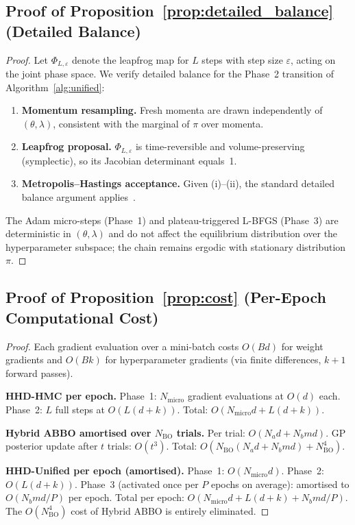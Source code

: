 \documentclass[11pt]{article}
\theoremstyle{definition}
\begin{document}
\subsection{Proof of Proposition~\ref{prop:detailed_balance} (Detailed Balance)}

\begin{proof}
Let $\Phi_{L,\varepsilon}$ denote the leapfrog map for $L$ steps with
step size $\varepsilon$, acting on the joint phase space.
We verify detailed balance for the Phase~2 transition of
Algorithm~\ref{alg:unified}:
\begin{enumerate}[label=(\roman*)]
  \item \textbf{Momentum resampling.} Fresh momenta are drawn
        independently of $(\theta,\lambda)$, consistent with the
        marginal of $\pi$ over momenta.

  \item \textbf{Leapfrog proposal.} $\Phi_{L,\varepsilon}$ is
        time-reversible and volume-preserving (symplectic), so its
        Jacobian determinant equals~1.

  \item \textbf{Metropolis--Hastings acceptance.} Given (i)--(ii),
        the standard detailed balance argument applies~\cite[Prop.~5.2]{neal2011}.
\end{enumerate}
The Adam micro-steps (Phase~1) and plateau-triggered L-BFGS
(Phase~3) are deterministic in $(\theta,\lambda)$ and do not affect
the equilibrium distribution over the hyperparameter subspace; the
chain remains ergodic with stationary distribution~$\pi$.
\end{proof}

\subsection{Proof of Proposition~\ref{prop:cost} (Per-Epoch Computational Cost)}

\begin{proof}
Each gradient evaluation over a mini-batch costs $O(Bd)$
for weight gradients and $O(Bk)$ for hyperparameter gradients
(via finite differences, $k+1$ forward passes).

\textbf{HHD-HMC per epoch.}
Phase~1: $N_{\mathrm{micro}}$ gradient evaluations at $O(d)$ each.
Phase~2: $L$ full steps at $O(L(d+k))$.
Total: $O(N_{\mathrm{micro}}d + L(d+k))$.

\textbf{Hybrid ABBO amortised over $N_{\mathrm{BO}}$ trials.}
Per trial: $O(N_a d + N_b md)$.
GP posterior update after $t$ trials: $O(t^3)$.
Total: $O\!\left(N_{\mathrm{BO}}(N_a d + N_b md) + N_{\mathrm{BO}}^4\right)$.

\textbf{HHD-Unified per epoch (amortised).}
Phase~1: $O(N_{\mathrm{micro}}d)$.
Phase~2: $O(L(d+k))$.
Phase~3 (activated once per $P$ epochs on average):
amortised to $O(N_b md/P)$ per epoch.
Total per epoch: $O(N_{\mathrm{micro}}d + L(d+k) + N_b md/P)$.
The $O(N_{\mathrm{BO}}^4)$ cost of Hybrid ABBO is
entirely eliminated.
\end{proof}
\end{document}

